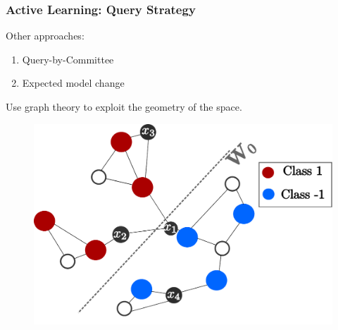 \documentclass[11pts]{beamer}
\begin{document}
\begin{frame}%
\frametitle{Active Learning: Query Strategy }


Other approaches:
\begin{enumerate}[\color{bar}\bfseries $\bullet$]
    \item Query-by-Committee 
    \item Expected model change
\end{enumerate}

Use graph theory to exploit the geometry of the space.

   \begin{figure}
  \begin{center}
  \vspace{0.2cm}
    \includegraphics[scale=0.4]{IM/FG.pdf}
  \end{center}
\end{figure}

\end{frame}


\end{document}
